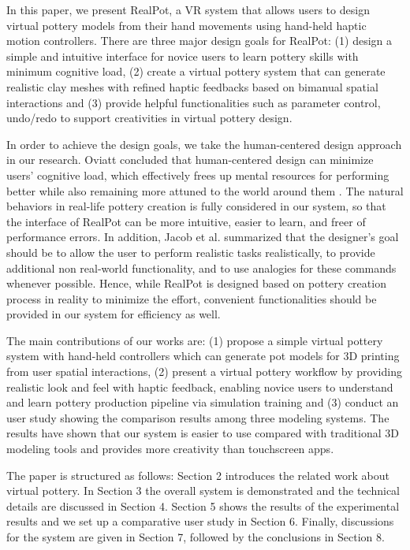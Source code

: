 \documentclass{svjour3}                     %
\begin{document}
In this paper, we present RealPot, a VR system that allows users to design virtual pottery models from their hand movements using hand-held haptic motion controllers.
There are three major design goals for RealPot:
(1) design a simple and intuitive interface for novice users to learn pottery skills with minimum cognitive load,
(2) create a virtual pottery system that can generate realistic clay meshes with refined haptic feedbacks based on bimanual spatial interactions 
and (3) provide helpful functionalities such as parameter control, undo/redo to support creativities in virtual pottery design.

In order to achieve the design goals, we take the human-centered design approach in our research.
Oviatt concluded that human-centered design can minimize users’ cognitive load, which effectively frees up mental resources for performing better while also remaining more attuned to the world around them \cite{oviatt2006human}.
The natural behaviors in real-life pottery creation is fully considered in our system, so that the interface of RealPot can be more intuitive, easier to learn, and freer of performance errors.
In addition, Jacob et al. \cite{Jacob2008Reality} summarized that the designer's goal should be to allow the user to perform realistic tasks realistically, to provide additional non real-world functionality, and to use analogies for these commands whenever possible.
Hence, while RealPot is designed based on pottery creation process in reality to minimize the effort, convenient functionalities should be provided in our system for efficiency as well.

The main contributions of our works are:
%
(1) propose a simple virtual pottery system with hand-held controllers which can generate pot models for 3D printing from user spatial interactions,
%
(2) present a virtual pottery workflow by providing realistic look and feel with haptic feedback, enabling novice users to understand and learn pottery production pipeline via simulation training 
%
and (3) conduct an user study showing the comparison results among three modeling systems. The results have shown that our system is easier to use compared with traditional 3D modeling tools and provides more creativity than touchscreen apps.

The paper is structured as follows:
Section 2 introduces the related work about virtual pottery.
In Section 3 the overall system is demonstrated and the technical details are discussed in Section 4.
Section 5 shows the results of the experimental results and we set up a comparative user study in Section 6.
Finally, discussions for the system are given in Section 7, followed by the conclusions in Section 8.
\end{document}
